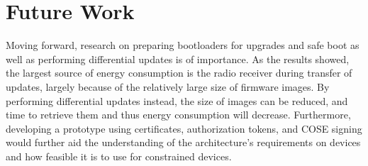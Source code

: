 \documentclass[0-thesis.tex]{subfiles}
\begin{document}
\section{Future Work}
\label{sec:future-work}
Moving forward, research on preparing bootloaders for upgrades and safe boot as well as
performing differential updates is of importance. As the results showed, the largest
source of energy consumption is the radio receiver during transfer of updates, largely
because of the relatively large size of firmware images. By performing differential
updates instead, the size of images can be reduced, and time to retrieve them and thus
energy consumption will decrease. Furthermore, developing a prototype using certificates,
authorization tokens, and COSE signing would further aid the understanding of the
architecture's requirements on devices and how feasible it is to use for constrained
devices. 
\end{document}
